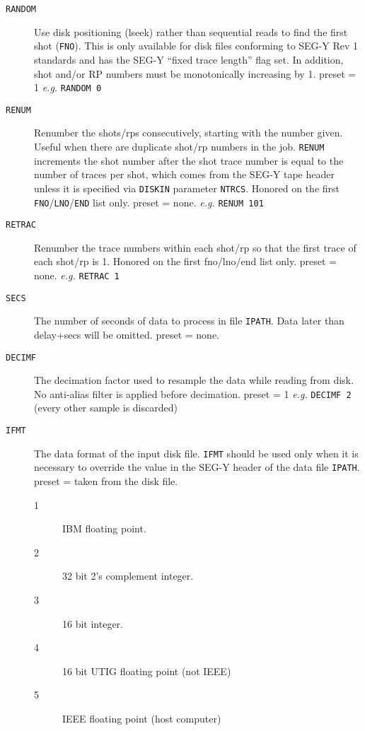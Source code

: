\begin{description}
\item[\texttt{RANDOM}] Use disk positioning (lseek) rather than sequential reads to
         find the first \gls{shot} (\texttt{FNO}).  This is only available for disk
         files conforming to SEG-Y Rev 1 standards and has the SEG-Y
         ``fixed trace length'' flag set.  In addition, \gls{shot} and/or RP
         numbers must be monotonically increasing by 1.
         \Gls{preset} = 1    \textit{e.g.}    \texttt{RANDOM 0}

\item[\texttt{RENUM}]  Renumber the \glspl{shot}/\glspl{rp} consecutively, starting with the
         number given.  Useful when there are duplicate \gls{shot}/\gls{rp}
         numbers in the job.  \texttt{RENUM} increments the \gls{shot} number
         after the \gls{shot} trace number is equal to the number of
         traces per \gls{shot}, which comes from the SEG-Y tape header
         unless it is specified via \texttt{DISKIN} parameter \texttt{NTRCS}.
         Honored on the first \texttt{FNO}/\texttt{LNO}/\texttt{END} list only.
         \Gls{preset} = none. \textit{e.g.}    \texttt{RENUM 101}

\item[\texttt{RETRAC}] Renumber the trace numbers within each \gls{shot}/\gls{rp} so that the
         first trace of each \gls{shot}/\gls{rp} is 1.
         Honored on the first fno/lno/end list only.
         \Gls{preset} = none. \textit{e.g.}     \texttt{RETRAC 1}

\item[\texttt{SECS}]   The number of seconds of data to process in file \texttt{IPATH}.
         Data later than delay+secs will be omitted.
         \Gls{preset} = none.

\item[\texttt{DECIMF}] The decimation factor used to resample the data while reading from disk.  No anti-alias filter is applied before decimation.
         \Gls{preset} = 1 \textit{e.g.} \texttt{DECIMF 2} (every other sample is discarded)

\item[\texttt{IFMT}]   The data format of the input disk file.  \texttt{IFMT} should be
    used only when it is necessary to override the value in the
    SEG-Y header of the data file \texttt{IPATH}.  \Gls{preset} = taken from the disk file.
    \begin{description}
        \item[1]  IBM floating point.
        \item[2]  32 bit 2's complement integer.
        \item[3]  16 bit integer.
        \item[4]  16 bit UTIG floating point (not IEEE)
        \item[5]  IEEE floating point (host computer)
    \end{description}


\end{description}
